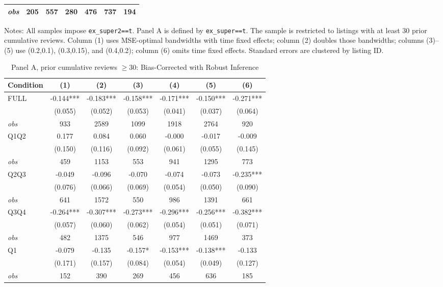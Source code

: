 \begin{table}[!htbp]
\begin{tabular}{lcccccc}
\textit{obs} & 205 & 557 & 280 & 476 & 737 & 194 \\
\bottomrule
\end{tabular}
\begin{minipage}{0.98\textwidth}\footnotesize
Notes: All samples impose \texttt{ex\_super2==t}. Panel A is defined by \texttt{ex\_super==t}. The sample is restricted to listings with at least 30 prior cumulative reviews. Column (1) uses MSE-optimal bandwidths with time fixed effects; column (2) doubles those bandwidths; columns (3)--(5) use (0.2,0.1), (0.3,0.15), and (0.4,0.2); column (6) omits time fixed effects. Standard errors are clustered by listing ID.
\end{minipage}
\end{table}

\begin{table}[!htbp]
\centering
\caption{Panel A, prior cumulative reviews $\geq30$: Bias-Corrected with Robust Inference}
\begin{tabular}{lcccccc}
\toprule
Condition & (1) & (2) & (3) & (4) & (5) & (6) \\
\midrule
FULL & -0.144*** & -0.183*** & -0.158*** & -0.171*** & -0.150*** & -0.271*** \\
 & (0.055) & (0.052) & (0.053) & (0.041) & (0.037) & (0.064) \\
\textit{obs} & 933 & 2589 & 1099 & 1918 & 2764 & 920 \\
Q1Q2 & 0.177 & 0.084 & 0.060 & -0.000 & -0.017 & -0.009 \\
 & (0.150) & (0.116) & (0.092) & (0.061) & (0.055) & (0.145) \\
\textit{obs} & 459 & 1153 & 553 & 941 & 1295 & 773 \\
Q2Q3 & -0.049 & -0.096 & -0.070 & -0.074 & -0.073 & -0.235*** \\
 & (0.076) & (0.066) & (0.069) & (0.054) & (0.050) & (0.090) \\
\textit{obs} & 641 & 1572 & 550 & 986 & 1391 & 661 \\
Q3Q4 & -0.264*** & -0.307*** & -0.273*** & -0.296*** & -0.256*** & -0.382*** \\
 & (0.057) & (0.060) & (0.062) & (0.054) & (0.051) & (0.071) \\
\textit{obs} & 482 & 1375 & 546 & 977 & 1469 & 373 \\
Q1 & -0.079 & -0.135 & -0.157* & -0.153*** & -0.138*** & -0.133 \\
 & (0.171) & (0.157) & (0.084) & (0.054) & (0.049) & (0.127) \\
\textit{obs} & 152 & 390 & 269 & 456 & 636 & 185 \\

\end{tabular}
\end{table}

